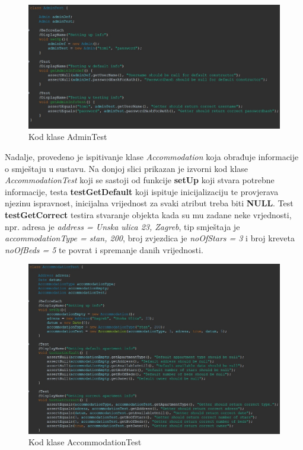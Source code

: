 			\begin{figure}[H]
				\includegraphics[width=\textwidth]{slike/adminTest.JPG}
				\caption{Kod klase AdminTest}
				\label{adminTest}
			\end{figure}
			
			Nadalje, provedeno je ispitivanje klase \textit{Accommodation} koja obrađuje informacije o smještaju u sustavu. Na donjoj slici prikazan je izvorni kod klase \textit{AccommodationTest} koji se sastoji od funkcije \textbf{setUp} koji stvara potrebne informacije, testa \textbf{testGetDefault} koji ispituje inicijalizaciju te provjerava njezinu ispravnost, inicijalna vrijednost za svaki atribut treba biti \textbf{NULL}. Test \textbf{testGetCorrect} testira stvaranje objekta kada su mu zadane neke vrjednosti, npr. adresa je \textit{address = Unska ulica 23, Zagreb}, tip smještaja je \textit{accommodationType = stan, 200}, broj zvjezdica je \textit{noOfStars = 3} i broj kreveta \textit{noOfBeds = 5} te povrat i spremanje danih vrijednosti.
			
			\begin{figure}[H]
				\includegraphics[width=\textwidth]{slike/AccommodationTest.JPG}
				\caption{Kod klase AccommodationTest}
				\label{AccommodationTest}
			\end{figure}
			
